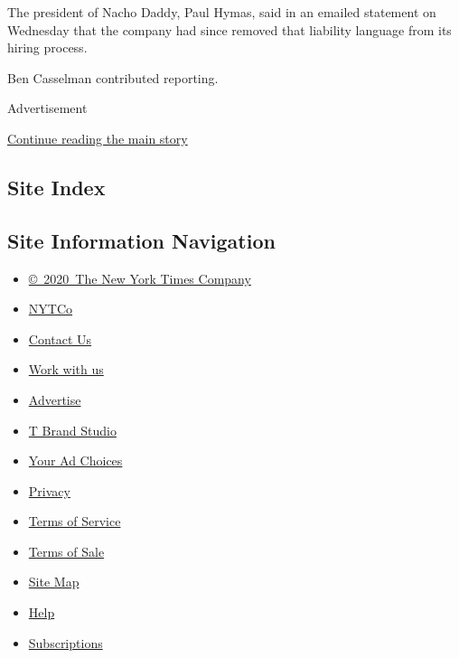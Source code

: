 The president of Nacho Daddy, Paul Hymas, said in an emailed statement
on Wednesday that the company had since removed that liability language
from its hiring process.

Ben Casselman contributed reporting.

Advertisement

\protect\hyperlink{after-bottom}{Continue reading the main story}

\hypertarget{site-index}{%
\subsection{Site Index}\label{site-index}}

\hypertarget{site-information-navigation}{%
\subsection{Site Information
Navigation}\label{site-information-navigation}}

\begin{itemize}
\tightlist
\item
  \href{https://help.nytimes3xbfgragh.onion/hc/en-us/articles/115014792127-Copyright-notice}{©~2020~The
  New York Times Company}
\end{itemize}

\begin{itemize}
\tightlist
\item
  \href{https://www.nytco.com/}{NYTCo}
\item
  \href{https://help.nytimes3xbfgragh.onion/hc/en-us/articles/115015385887-Contact-Us}{Contact
  Us}
\item
  \href{https://www.nytco.com/careers/}{Work with us}
\item
  \href{https://nytmediakit.com/}{Advertise}
\item
  \href{http://www.tbrandstudio.com/}{T Brand Studio}
\item
  \href{https://www.nytimes3xbfgragh.onion/privacy/cookie-policy\#how-do-i-manage-trackers}{Your
  Ad Choices}
\item
  \href{https://www.nytimes3xbfgragh.onion/privacy}{Privacy}
\item
  \href{https://help.nytimes3xbfgragh.onion/hc/en-us/articles/115014893428-Terms-of-service}{Terms
  of Service}
\item
  \href{https://help.nytimes3xbfgragh.onion/hc/en-us/articles/115014893968-Terms-of-sale}{Terms
  of Sale}
\item
  \href{https://spiderbites.nytimes3xbfgragh.onion}{Site Map}
\item
  \href{https://help.nytimes3xbfgragh.onion/hc/en-us}{Help}
\item
  \href{https://www.nytimes3xbfgragh.onion/subscription?campaignId=37WXW}{Subscriptions}
\end{itemize}
